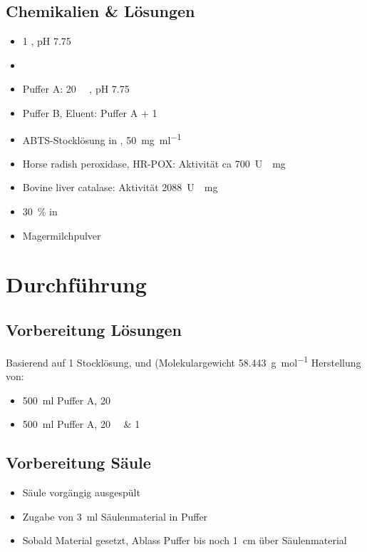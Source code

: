 \documentclass[a4paper,german]{scrreprt}
\begin{document}
\section{Chemikalien \& Lösungen}

\begin{itemize}
	\item  \SI{1}{\Molar} , pH 7.75
	\item {}
	\item Puffer A: \SI{20}{\milli\Molar} , pH 7.75
	\item Puffer B, Eluent: Puffer A + \SI{1}{\Molar} 
	\item ABTS-Stocklösung in , \SI{50}{\milli\gram \per \milli\litre}
	\item Horse radish peroxidase, HR-POX: Aktivität ca \SI{700}{U \per \milli\gram}
	\item Bovine liver catalase: Aktivität \SI{2088}{U \per \milli\gram}
	\item {} \SI{30}{\percent} in 
	\item Magermilchpulver
\end{itemize}

\cite{skriptv9}

\chapter{Durchführung}

\section{Vorbereitung Lösungen}

Basierend auf \SI{1}{\Molar}  Stocklösung, und 
(Molekulargewicht \SI{58.443}{\gram\per mol} Herstellung von:
\begin{itemize}
	\item \SI{500}{ml} Puffer A, \SI{20}{\milli\Molar} 
	\item \SI{500}{ml} Puffer A, \SI{20}{\milli\Molar}  \& \SI{1}{\Molar} 
\end{itemize}

\section{Vorbereitung Säule}

\begin{itemize}
	\item Säule vorgängig ausgespült
	\item Zugabe von \SI{3}{ml} Säulenmaterial in Puffer
	\item Sobald Material gesetzt, Ablass Puffer bis noch \SI{1}{cm} über Säulenmaterial
\end{itemize}
\end{document}
